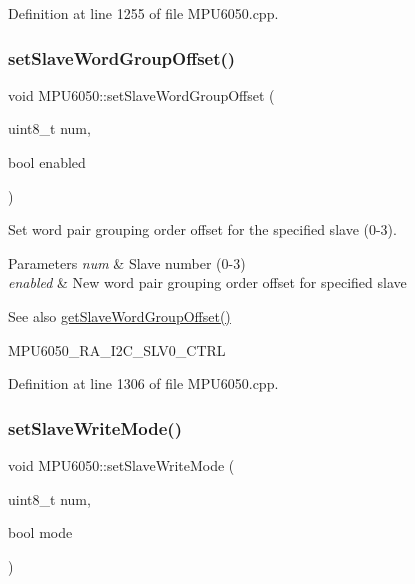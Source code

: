 Definition at line 1255 of file M\+P\+U6050.\+cpp.

\mbox{\label{classMPU6050_a32602ab86f70b70d3313628fc6c010ae}} 
\subsubsection{\texorpdfstring{setSlaveWordGroupOffset()}{setSlaveWordGroupOffset()}}
{\footnotesize\ttfamily void M\+P\+U6050\+::set\+Slave\+Word\+Group\+Offset (\begin{DoxyParamCaption}\item[{uint8\+\_\+t}]{num,  }\item[{bool}]{enabled }\end{DoxyParamCaption})}



Set word pair grouping order offset for the specified slave (0-\/3). 


\begin{DoxyParams}{Parameters}
{\em num} & Slave number (0-\/3) \\
\hline
{\em enabled} & New word pair grouping order offset for specified slave \\
\hline
\end{DoxyParams}
\begin{DoxySeeAlso}{See also}
\mbox{\hyperlink{classMPU6050_a32ce8023bb80afc5d55811de70c7214f}{get\+Slave\+Word\+Group\+Offset()}} 

M\+P\+U6050\+\_\+\+R\+A\+\_\+\+I2\+C\+\_\+\+S\+L\+V0\+\_\+\+C\+T\+RL 
\end{DoxySeeAlso}


Definition at line 1306 of file M\+P\+U6050.\+cpp.

\mbox{\label{classMPU6050_a3d9bfcb5394c7a382009cd2dc91ce801}} 
\subsubsection{\texorpdfstring{setSlaveWriteMode()}{setSlaveWriteMode()}}
{\footnotesize\ttfamily void M\+P\+U6050\+::set\+Slave\+Write\+Mode (\begin{DoxyParamCaption}\item[{uint8\+\_\+t}]{num,  }\item[{bool}]{mode }\end{DoxyParamCaption})}



